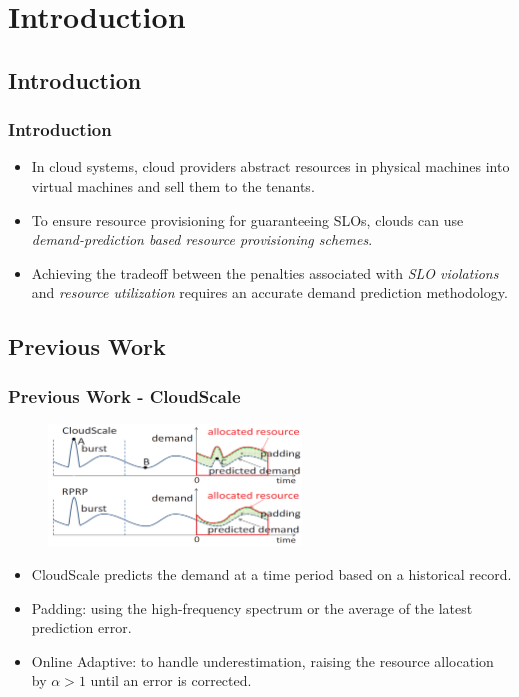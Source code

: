 \documentclass{beamer}
\begin{document}
\section{Introduction}

\subsection{Introduction}
    \begin{frame}
    \frametitle{Introduction}
		\begin{itemize}
		\item In cloud systems, cloud providers abstract resources in physical machines into virtual machines and sell them to the tenants.
		\item To ensure resource provisioning for guaranteeing SLOs\footnotemark[1], clouds can use {\it demand-prediction based resource provisioning schemes}.
		\item Achieving the tradeoff between the penalties associated with {\it SLO violations} and {\it resource utilization} requires an accurate demand prediction methodology.
		\end{itemize}
    \end{frame}

\subsection{Previous Work}
	\begin{frame}
	\frametitle{Previous Work - CloudScale}
		\begin{figure}[h!]
		\centering
		\includegraphics[width=0.6\textwidth]{./figure/intro.PNG}
		\end{figure}
		\begin{itemize}
		\item CloudScale predicts the demand at a time period based on a historical record.
		\item Padding: using the high-frequency spectrum or the average of the latest prediction error.
		\item Online Adaptive: to handle underestimation, raising the resource allocation by $\alpha>1$ until an error is corrected.
		\end{itemize}
	\end{frame}
\end{document}
